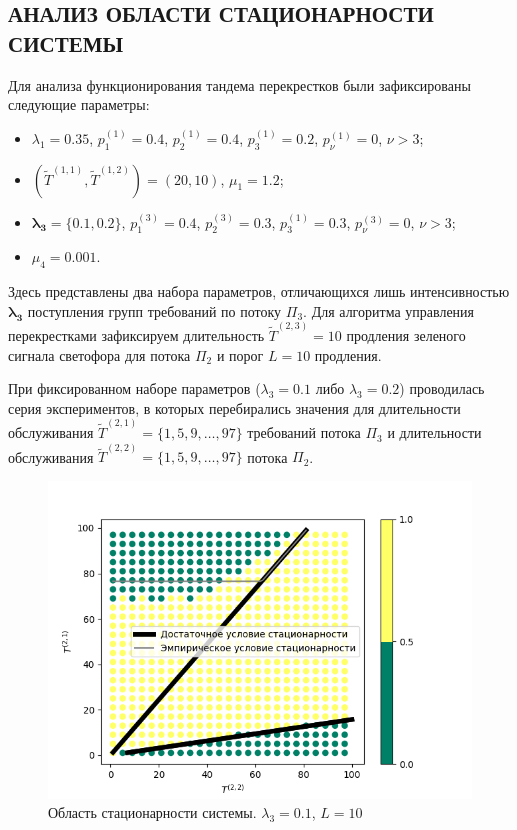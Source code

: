 \documentclass[11pt]{ubs}
\begin{document}
\subsection{АНАЛИЗ ОБЛАСТИ СТАЦИОНАРНОСТИ СИСТЕМЫ}
Для анализа функционирования тандема перекрестков были зафиксированы следующие параметры:
\begin{itemize}
    \item $\lambda_1=0.35$, $p_{1}^{(1)}=0.4$, $p_{2}^{(1)}=0.4$, $p_{3}^{(1)}=0.2$, $p_{\nu}^{(1)}=0$, $\nu > 3$;
    \item $(\widetilde{T}^{(1,1)}, \widetilde{T}^{(1,2)})=(20,10)$, $\mu_1 = 1.2$;
    \item $\boldsymbol{ \lambda_3=\{0.1, 0.2\}}$, $p_{1}^{(3)}=0.4$, $p_{2}^{(3)}=0.3$, $p_{3}^{(1)}=0.3$, $p_{\nu}^{(3)}=0$, $\nu > 3$;
        \item $\mu_4= 0.001$.
\end{itemize}
Здесь представлены два набора параметров, отличающихся лишь интенсивностью $\boldsymbol{\lambda_3}$ поступления групп требований по потоку $\Pi_3$. Для алгоритма управления перекрестками зафиксируем длительность $\widetilde{T}^{(2,3)}=10$ продления зеленого сигнала светофора для потока $\Pi_2$ и порог $L=10$ продления.

При фиксированном наборе параметров ($\lambda_3 = 0.1$ либо $\lambda_3=0.2$) проводилась серия экспериментов, в которых перебирались значения для длительности обслуживания  $\widetilde{T}^{(2,1)} = \{1, 5, 9, \ldots, 97\}$ требований потока $\Pi_3$ и длительности обслуживания $\widetilde{T}^{(2,2)} = \{1, 5, 9, \ldots, 97\}$ потока $\Pi_2$.

\begin{figure}[ht]
\centering
\includegraphics[scale=0.7]{0_1_thres_10_target_fact_.png} 
\caption{Область стационарности системы. $\lambda_3=0.1$, $L=10$}
\label{Experiment:stationar}
\end{figure}
\end{document}

